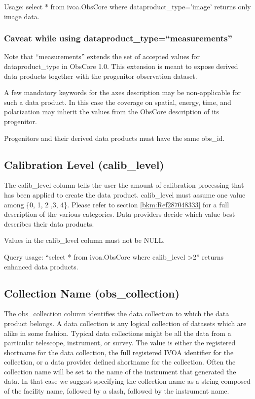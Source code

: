 \documentclass[11pt,a4paper]{ivoa}
\begin{document}
Usage: select * from ivoa.ObsCore where dataproduct\_type='image' returns only image data.

\subsubsection{Caveat while using dataproduct\_type=``measurements''}
Note that ``measurements'' extends the set of accepted values for dataproduct\_type in ObsCore 1.0. This extension is
meant to expose derived data products together with the progenitor observation dataset.

A few mandatory keywords for the axes description may be non-applicable for such a data product. In this case the
coverage on spatial, energy, time, and polarization may inherit the values from the ObsCore description of its
progenitor.

Progenitors and their derived data products must have the same obs\_id.

\subsection{Calibration Level (calib\_level)}
The calib\_level column tells the user the amount of calibration processing that has been applied to create the data
product. calib\_level must assume one value among \{0, 1, 2 ,3, 4\}. Please refer to section \ref{bkm:Ref287048333} for
a full description of the various categories.  Data providers decide which value best describes their data products.

Values in the calib\_level column must not be NULL.

Query usage: ``select * from ivoa.ObsCore where calib\_level {\textgreater}2'' returns enhanced data products.

\subsection{Collection Name (obs\_collection)}
The obs\_collection column identifies the data collection to which the data product belongs.  A data collection is any
logical collection of datasets which are alike in some fashion.  Typical data collections might be all the data from a
particular telescope, instrument, or survey. The value is either the registered shortname for the data collection, the
full registered IVOA identifier for the collection, or a data provider defined shortname for the collection.  Often the
collection name will be set to the name of the instrument that generated the data.  In that case we suggest specifying
the collection name as a string composed of the facility name, followed by a slash, followed by the instrument name.
\end{document}
